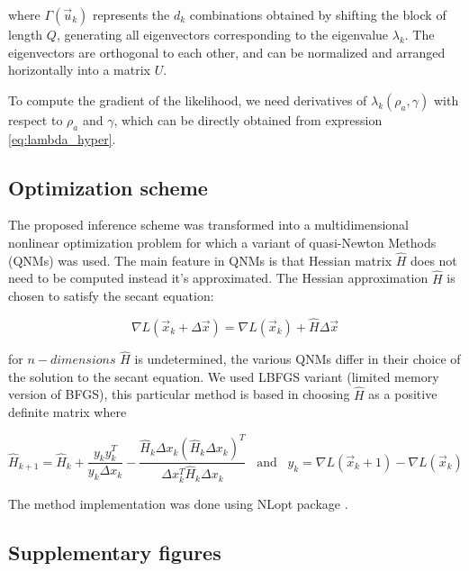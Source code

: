 \documentclass[preprint,amsmath,amssymb,superscriptaddress,showpacs,pre]{revtex4-1}
\begin{document}
where $\Gamma(\vec{u}_k )$ represents the $d_k$ combinations obtained by shifting the block of length $Q$, generating all eigenvectors corresponding to the eigenvalue $\lambda_k$.  The eigenvectors are orthogonal to each other, and can be  normalized and arranged horizontally into a matrix $U$. 

To compute the gradient of the likelihood, we need  derivatives of $\lambda_k(\rho_a,\gamma)$ with respect to $\rho_a$ and $\gamma$, which can be directly obtained from expression \eqref{eq:lambda_hyper}.


\subsection{Optimization scheme}
\label{sub:optimization_scheme}

The proposed inference scheme was transformed into a multidimensional nonlinear optimization problem for which a variant  of quasi-Newton Methods (QNMs) was used.  The main feature in QNMs is that Hessian matrix $\hat{H}$  does not need to be computed instead it’s approximated. The Hessian approximation $\hat{H}$ is chosen to satisfy the secant equation:

$$\nabla L(\vec{x}_k+\Delta\vec{x})=\nabla L(\vec{x}_k)+\hat{H} \Delta\vec{x} $$


for $n-dimensions$ $\hat{H}$ is undetermined, the various QNMs differ in their choice of the solution to the secant equation. We used LBFGS variant  (limited memory version of BFGS), this particular method is based in choosing $\hat{H}$ as a positive definite matrix where

$$\hat{H}_{k+1}=\hat{H}_{k}+\frac{y_k y^{T}_k}{y_k\Delta x_k} - \frac{\hat{H}_k\Delta x_k(\hat{H}_k\Delta x_k)^T}{\Delta x^T_k\hat{H}_k\Delta x_k} \;\;\;\text{and}\;\;\; y_k=\nabla L(\vec{x}_k+1)-\nabla L(\vec{x}_k)$$

The method implementation was done using   NLopt package \cite{NLopt} .
 
\subsection{Supplementary figures}
\label{sub:supplementary_figures}
\end{document}
